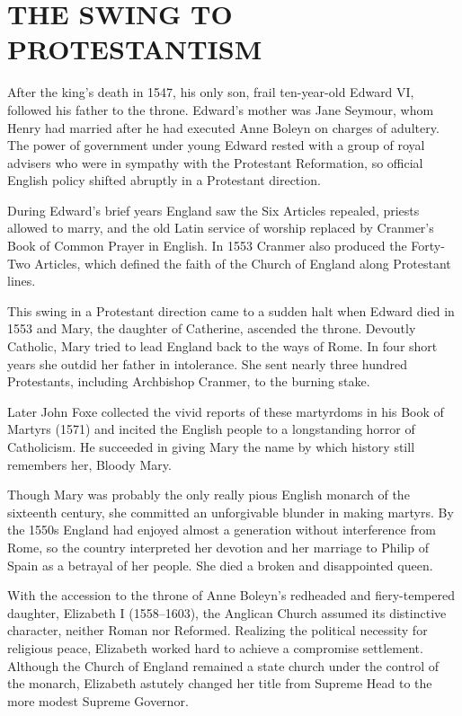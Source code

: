\section{THE SWING TO PROTESTANTISM}

After the king’s death in 1547, his only son, frail ten-year-old Edward VI, followed his father to
the throne. Edward’s mother was Jane Seymour, whom Henry had married after he had executed Anne
Boleyn on charges of adultery. The power of government under young Edward rested with a group of
royal advisers who were in sympathy with the Protestant Reformation, so official English policy
shifted abruptly in a Protestant direction.

During Edward’s brief years England saw the Six Articles repealed, priests allowed to marry, and the
old Latin service of worship replaced by Cranmer’s Book of Common Prayer in English. In 1553 Cranmer
also produced the Forty-Two Articles, which defined the faith of the Church of England along
Protestant lines.

This swing in a Protestant direction came to a sudden halt when Edward died in 1553 and Mary, the
daughter of Catherine, ascended the throne. Devoutly Catholic, Mary tried to lead England back to
the ways of Rome. In four short years she outdid her father in intolerance. She sent nearly three
hundred Protestants, including Archbishop Cranmer, to the burning stake.

Later John Foxe collected the vivid reports of these martyrdoms in his Book of Martyrs (1571) and
incited the English people to a longstanding horror of Catholicism. He succeeded in giving Mary the
name by which history still remembers her, Bloody Mary.

Though Mary was probably the only really pious English monarch of the sixteenth century, she
committed an unforgivable blunder in making martyrs. By the 1550s England had enjoyed almost a
generation without interference from Rome, so the country interpreted her devotion and her marriage
to Philip of Spain as a betrayal of her people. She died a broken and disappointed queen.

With the accession to the throne of Anne Boleyn’s redheaded and fiery-tempered daughter, Elizabeth I
(1558–1603), the Anglican Church assumed its distinctive character, neither Roman nor Reformed.
Realizing the political necessity for religious peace, Elizabeth worked hard to achieve a compromise
settlement. Although the Church of England remained a state church under the control of the monarch,
Elizabeth astutely changed her title from Supreme Head to the more modest Supreme Governor.

